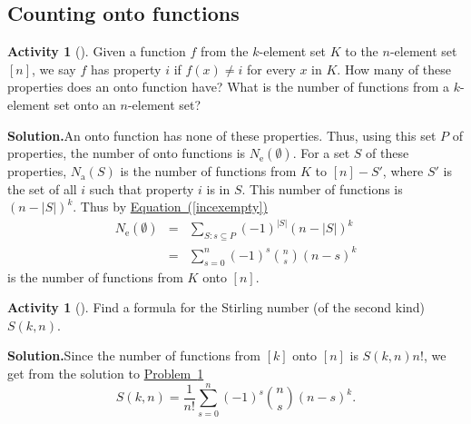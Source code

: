 \documentclass[10pt,]{book}
\theoremstyle{plain}
\theoremstyle{definition}
\newtheorem{activity}[project]{Activity}
\numberwithin{equation}{chapter}
\newcommand{\amp}{&}
\begin{document}
\subsection[{Counting onto functions}]{Counting onto functions}\label{subsection-55}
\begin{activity}[]\label{numontofun}
Given a function \(f\) from the \(k\)-element set \(K\) to the \(n\)-element set \([n]\), we say \(f\) has property \(i\) if \(f(x)\not= i\) for every \(x\) in \(K\). How many of these properties does an onto function have? What is the number of functions from a \(k\)-element set onto an \(n\)-element set?%
\par\medskip\noindent%
\textbf{Solution.}\quad An onto function has none of these properties. Thus, using this set \(P\) of properties, the number of onto functions is \(N_{\mbox{e} }(\emptyset)\). For a set \(S\) of these properties, \(N_{\mbox{a} }(S)\) is the number of functions from \(K\) to \([n]-S'\), where \(S'\) is the set of all \(i\) such that property \(i\) is in \(S\). This number of functions is \((n-|S|)^k\). Thus by \hyperref[incexempty]{Equation~(\ref{incexempty})}%
\begin{align*}
N_{\mbox{e} }(\emptyset) \amp =\amp  \sum_{S:s\subseteq P} (-1)^{|S|}
(n-|S|)^k\\
\amp =\amp \sum_{s=0}^n (-1)^s\binom{n}{s}(n-s)^k
\end{align*}
is the number of functions from \(K\) onto \([n]\).%
\end{activity}
\begin{activity}[]\label{activity-220}
Find a formula for the Stirling number (of the second kind) \(S(k,n)\).%
\par\medskip\noindent%
\textbf{Solution.}\quad Since the number of functions from \([k]\) onto \([n]\) is \(S(k,n)n!\), we get from the solution to \hyperref[numontofun]{Problem~\ref{numontofun}}%
\begin{equation*}
S(k,n) = \frac{1}{n!}\sum_{s=0}^n (-1)^s\binom{n}{s}(n-s)^k.
\end{equation*}
%
\end{activity}
\typeout{************************************************}
\typeout{************************************************}
\end{document}
